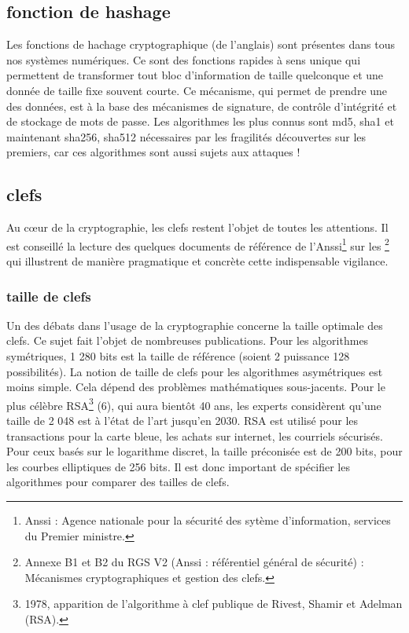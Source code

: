 


\subsection{fonction de hashage}

Les fonctions de hachage cryptographique (de l'anglais) sont présentes dans tous nos systèmes numériques. Ce sont des fonctions rapides à sens unique qui permettent de transformer tout bloc d'information de taille quelconque et une donnée de taille fixe souvent courte. Ce mécanisme, qui permet de prendre une des données, est à la base des mécanismes de signature, de contrôle d'intégrité et de stockage de mots de passe. Les algorithmes les plus connus sont md5, sha1 et maintenant sha256, sha512 nécessaires par les fragilités découvertes sur les premiers, car ces algorithmes sont aussi sujets aux attaques !


\subsection{clefs}
Au cœur de la cryptographie, les clefs restent l'objet de toutes les attentions. Il est conseillé la lecture des quelques documents de référence de l'Anssi\footnote{Anssi : Agence nationale pour la sécurité des sytème d'information, services du Premier ministre.} sur les \footnote{Annexe B1 et B2 du RGS V2 (Anssi : référentiel général de sécurité) : Mécanismes cryptographiques et gestion des clefs.} qui illustrent de manière pragmatique et concrète cette indispensable vigilance.
\subsubsection{taille de clefs}
Un des débats dans l'usage de la cryptographie concerne la taille optimale des clefs. Ce sujet fait l'objet de nombreuses publications. Pour les algorithmes symétriques, 1 280 bits est la taille de référence (soient 2 puissance 128 possibilités). La notion de taille de clefs pour les algorithmes asymétriques est moins simple. Cela dépend des problèmes mathématiques sous-jacents. Pour le plus célèbre RSA\footnote{1978, apparition de l'algorithme à clef publique de Rivest, Shamir et Adelman (RSA).} (6), qui aura bientôt 40 ans, les experts considèrent qu'une taille de 2 048 est à l'état de l'art jusqu'en 2030. RSA est utilisé pour les transactions pour la carte bleue, les achats sur internet, les courriels sécurisés. Pour ceux basés sur le logarithme discret, la taille préconisée est de 200 bits, pour les courbes elliptiques de 256 bits. Il est donc important de spécifier les algorithmes pour comparer des tailles de clefs.
